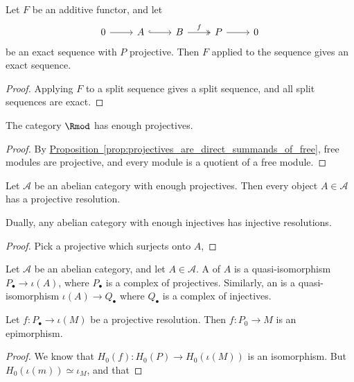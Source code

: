 \documentclass[main.tex]{subfiles}
\begin{document}
\begin{corollary}
  Let $F$ be an additive functor, and let
  \begin{equation*}
    \begin{tikzcd}
      0
      \arrow[r]
      & A
      \arrow[r, hookrightarrow]
      & B
      \arrow[r, twoheadrightarrow, "f"]
      & P
      \arrow[r]
      & 0
    \end{tikzcd}
  \end{equation*}
  be an exact sequence with $P$ projective. Then $F$ applied to the sequence gives an exact sequence.
\end{corollary}
\begin{proof}
  Applying $F$ to a split sequence gives a split sequence, and all split sequences are exact.
\end{proof}

\begin{corollary}
  The category $\Rmod$ has enough projectives.
\end{corollary}
\begin{proof}
  By \hyperref[prop:projectives_are_direct_summands_of_free]{Proposition~\ref*{prop:projectives_are_direct_summands_of_free}}, free modules are projective, and every module is a quotient of a free module.
\end{proof}

\begin{proposition}
  Let $\mathcal{A}$ be an abelian category with enough projectives. Then every object $A \in \mathcal{A}$ has a projective resolution.

  Dually, any abelian category with enough injectives has injective resolutions.
\end{proposition}
\begin{proof}
  Pick a projective which surjects onto $A$,
\end{proof}

\begin{definition}
  \label{def:projective_injective_resolution}
  Let $\mathcal{A}$ be an abelian category, and let $A \in \mathcal{A}$. A  of $A$ is a quasi-isomorphism $P_{\bullet} \to \iota(A)$, where $P_{\bullet}$ is a complex of projectives. Similarly, an  is a quasi-isomorphism $\iota(A) \to Q_{\bullet}$ where $Q_{\bullet}$ is a complex of injectives.
\end{definition}

\begin{lemma}
  \label{lemma:projective_resolution_epimorphism}
  Let $f\colon P_{\bullet} \to \iota(M)$ be a projective resolution. Then $f\colon P_{0} \to M$ is an epimorphism.
\end{lemma}
\begin{proof}
  We know that $H_{0}(f)\colon H_{0}(P) \to H_{0}(\iota (M))$ is an isomorphism. But $H_{0}(\iota(m)) \simeq \iota_{M}$, and that
\end{proof}
\end{document}
